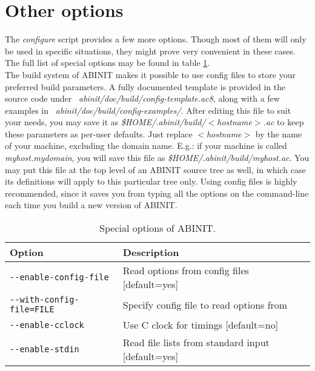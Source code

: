 \section{Other options}

The \textit{configure} script provides a few more options. Though
most of them will only be used in specific situations, they might
prove very convenient in these cases. The full list of special options
may be found in table \ref{tab:opt-special}. \\


The build system of ABINIT makes it possible to use config files to
store your preferred build parameters. A fully documented template
is provided in the source code under \textit{~abinit/doc/build/config-template.ac8},
along with a few examples in \textit{~abinit/doc/build/config-examples/}.
After editing this file to suit your needs, you may save it as \textit{\$HOME/.abinit/build/$<$hostname$>$.ac}
to keep these parameters as per-user defaults. Just replace \textit{$<$hostname$>$}
by the name of your machine, excluding the domain name. E.g.: if your
machine is called \textit{myhost.mydomain}, you will save this file
as \textit{\$HOME/.abinit/build/myhost.ac}. You may put this file
at the top level of an ABINIT source tree as well, in which case its
definitions will apply to this particular tree only. Using config
files is highly recommended, since it saves you from typing all the
options on the command-line each time you build a new version of ABINIT.
\\


%
\begin{table}
\begin{centering}
\begin{tabular}{|l|l|}
\hline 
\textbf{Option}  & \textbf{Description} \tabularnewline
\hline 
\texttt{-{-}enable-config-file}  & Read options from config files {[}default=yes{]} \tabularnewline
\texttt{-{-}with-config-file=FILE}  & Specify config file to read options from \tabularnewline
\hline 
\texttt{-{-}enable-cclock}  & Use C clock for timings {[}default=no{]} \tabularnewline
\hline 
\texttt{-{-}enable-stdin}  & Read file lists from standard input {[}default=yes{]} \tabularnewline
\hline
\end{tabular}
\par\end{centering}

\caption{Special options of ABINIT.}


\label{tab:opt-special} 
\end{table}

